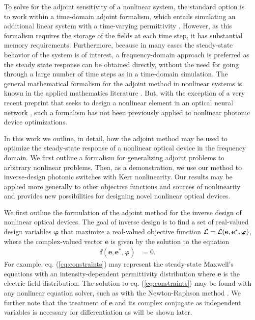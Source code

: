 To solve for the adjoint sensitivity of a nonlinear system, the standard option is to work within a time-domain adjoint formalism, which entails simulating an additional linear system with a time-varying permittivity \cite{elesin_design_2012}.  However, as this formalism requires the storage of the fields at each time step, it has substantial memory requirements.  Furthermore, because in many cases the steady-state behavior of the system is of interest, a frequency-domain approach is preferred as the steady state response can be obtained directly, without the need for going through a large number of time steps as in a time-domain simulation.  The general mathematical formalism for the adjoint method in nonlinear systems is known in the applied mathematics literature \cite{Strang2007}. But, with the exception of a very recent preprint that seeks to design a nonlinear element in an optical neural network  \cite{khoram2018stochastic}, such a formalism has not been previously applied to nonlinear photonic device optimizations.

In this work we outline, in detail, how the adjoint method may be used to optimize the steady-state response of a nonlinear optical device in the frequency domain. We first outline a formalism for generalizing adjoint problems to arbitrary nonlinear problems.  Then, as a demonstration, we use our method to inverse-design photonic switches with Kerr nonlinearity.  Our results may be applied more generally to other objective functions and sources of nonlinearity and provides new possibilities for designing novel nonlinear optical devices.

We first outline the formulation of the adjoint method for the inverse design of nonlinear optical devices.  The goal of inverse design is to find a set of real-valued design variables $\bm{\varphi}$ that maximize a real-valued objective function $\mathbf{\mathcal{L}} = \mathbf{\mathcal{L}}(\mathbf{e}, \mathbf{e}^*, \bm{\varphi})$, where the complex-valued vector $\mathbf{e}$ is given by the solution to the equation
%
\begin{align}
\mathbf{f}(\mathbf{e}, \mathbf{e}^*, \bm{\varphi}) &= 0
\label{eq:constraints}.
\end{align}
%
For example, eq. (\ref{eq:constraints}) may represent the steady-state Maxwell's equations with an intensity-dependent permittivity distribution where $\mathbf{e}$ is the electric field distribution.  The solution to eq. (\ref{eq:constraints}) may be found with any nonlinear equation solver, such as with the Newton-Raphson method \cite{press2007numerical}.  We further note that the treatment of $\mathbf{e}$ and its complex conjugate as independent variables is necessary for differentiation as will be shown later.

